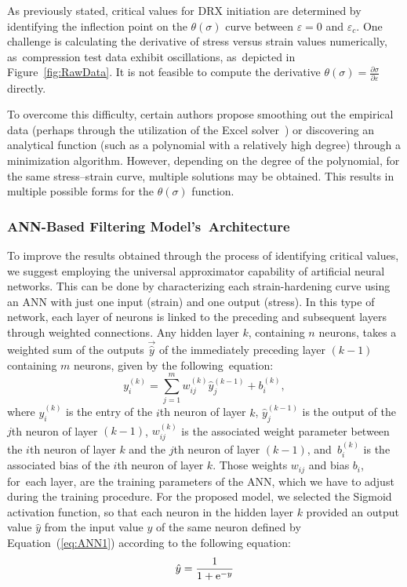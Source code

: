 \documentclass[metals,article,accept,pdftex,moreauthors]{Definitions/mdpi}
\DeclareRobustCommand{\e}[1]{{\rm e}^{#1}}
\DeclareRobustCommand{\lay}[1]{^{(#1)}}
\begin{document}
As previously stated, critical values for DRX initiation are determined by identifying the inflection point on the $\theta(\sigma)$ curve between $\varepsilon=0$ and $\varepsilon_c$.
One challenge is calculating the derivative of stress versus strain values numerically, as~compression test data exhibit oscillations, as~depicted in Figure~\ref{fig:RawData}.
It is not feasible to compute the derivative $\theta(\sigma)=\frac{\partial \sigma}{\partial \varepsilon}$ directly.

To overcome this difficulty, certain authors propose smoothing out the empirical data (perhaps through the utilization of the Excel solver~\cite{Najafizadeh-2006}) or discovering an analytical function (such as a polynomial with a relatively high degree) through a minimization algorithm.
\linebreak However, depending on the degree of the polynomial, for the same stress--strain curve, multiple solutions may be obtained.
This results in multiple possible forms for the $\theta(\sigma)$ function.

\subsubsection{ANN-Based Filtering Model's~Architecture}\label{subsec:ANNbasics}

To improve the results obtained through the process of identifying critical values, we suggest employing the universal approximator capability of artificial neural networks.
\linebreak This can be done by characterizing each strain-hardening curve using an ANN with just one input (strain) and one output (stress).
In this type of network, each layer of neurons is linked to the preceding and subsequent layers through weighted connections.
Any hidden layer $k$, containing $n$ neurons, takes a weighted sum of the outputs $\overrightarrow{\hat{y}}$ of the immediately preceding layer $(k-1)$ containing $m$ neurons, given by the following~equation:
\begin{equation}
y_i\lay{k} = \sum_{j=1}^m w_{ij}\lay{k} \hat{y}_j^{(k-1)}+ b_i\lay{k},\label{eq:ANN1}
\end{equation}
where $y_i\lay{k}$ is the entry of the $i$th neuron of layer $k$, $\hat{y}_j\lay{k-1}$ is the output of the $j$th neuron of layer $(k-1)$, $w_{ij}\lay{k}$ is the associated weight parameter between the $i$th neuron of layer $k$ and the $j$th neuron of layer $(k-1)$, and~$b_i\lay{k}$ is the associated bias of the $i$th neuron of layer $k$.
Those weights $w_{ij}$ and bias $b_i$, for~each layer, are the training parameters of the ANN, which we have to adjust during the training procedure.
For the proposed model, we selected the Sigmoid activation function, so that each neuron in the hidden layer $k$ provided an output value ${\hat{y}}$ from the input value $y$ of the same neuron defined by Equation~(\ref{eq:ANN1}) according to the following equation:
\begin{equation}
\hat{y}=\frac{1}{1 + \e{-y}}\label{eq:ANN2}
\end{equation}
\end{document}
